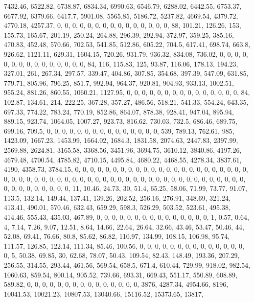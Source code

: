 \documentclass[
]{article}
\begin{document}
7432.46, 6522.82, 6738.87, 6834.34, 6990.63, 6546.79, 6288.02, 6442.55,
6753.37, 6677.92, 6379.66, 6417.7, 5901.08, 5565.85, 5186.72, 5237.82,
4669.54, 4379.72, 4770.18, 4257.37, 0, 0, 0, 0, 0, 0, 0, 0, 0, 0, 0, 0,
0, 0, 0, 88, 101.21, 126.26, 153, 155.73, 165.67, 201.19, 250.24,
264.88, 296.39, 292.94, 372.97, 359.25, 385.16, 470.83, 452.48, 570.66,
702.53, 541.85, 512.86, 605.22, 704.5, 617.41, 698.74, 663.8, 926.62,
1121.11, 629.31, 1604.15, 720.26, 931.79, 936.32, 834.08, 736.02, 0, 0,
0, 0, 0, 0, 0, 0, 0, 0, 0, 0, 0, 0, 0, 84, 116, 115.83, 125, 93.87,
116.06, 178.13, 194.23, 327.01, 261, 267.34, 297.57, 339.47, 404.86,
307.85, 354.68, 397.39, 547.09, 631.85, 779.71, 805.96, 796.25, 851.7,
992.94, 964.37, 920.81, 904.93, 933.13, 1002.51, 955.24, 881.26, 860.55,
1060.21, 1127.95, 0, 0, 0, 0, 0, 0, 0, 0, 0, 0, 0, 0, 0, 0, 0, 84,
102.87, 134.61, 214, 222.25, 367.28, 357.27, 486.56, 518.21, 541.33,
554.24, 643.35, 697.33, 774.22, 783.24, 770.19, 852.86, 864.07, 878.38,
928.41, 947.04, 895.94, 889.15, 923.74, 1064.05, 1007.27, 923.73,
816.62, 730.03, 732.5, 686.46, 689.75, 699.16, 709.5, 0, 0, 0, 0, 0, 0,
0, 0, 0, 0, 0, 0, 0, 0, 0, 539, 789.13, 762.61, 985, 1423.09, 1667.23,
1453.99, 1664.02, 1684.3, 1831.58, 2074.63, 2447.83, 2397.99, 2569.88,
2624.81, 3165.58, 3368.56, 3451.96, 3694.75, 3610.12, 3840.86, 4197.26,
4679.48, 4700.54, 4785.82, 4710.15, 4495.84, 4680.22, 4468.55, 4278.34,
3837.61, 4190, 4358.73, 3784.15, 0, 0, 0, 0, 0, 0, 0, 0, 0, 0, 0, 0, 0,
0, 0, 0, 0, 0, 0, 0, 0, 0, 0, 0, 0, 0, 0, 0, 0, 0, 0, 0, 0, 0, 0, 0, 0,
0, 0, 0, 0, 0, 0, 0, 0, 0, 0, 0, 0, 0, 0, 0, 0, 0, 0, 0, 0, 0, 0, 0, 0,
0, 0, 0, 11, 10.46, 24.73, 30, 51.4, 65.25, 58.06, 71.99, 73.77, 91.07,
113.5, 132.14, 149.44, 137.41, 139.26, 202.52, 256.16, 276.91, 348.69,
321.24, 413.41, 490.01, 570.46, 632.43, 659.29, 598.3, 526.29, 503.52,
523.61, 495.38, 414.46, 555.43, 435.03, 467.89, 0, 0, 0, 0, 0, 0, 0, 0,
0, 0, 0, 0, 0, 0, 0, 1, 0.57, 0.64, 4, 7.14, 7.26, 9.07, 12.51, 8.64,
14.66, 22.64, 26.64, 32.66, 43.46, 53.47, 50.46, 44, 52.08, 69.41,
76.66, 80.8, 85.62, 86.82, 110.97, 134.99, 108.15, 106.98, 95.74,
111.57, 126.85, 122.14, 111.34, 85.46, 100.56, 0, 0, 0, 0, 0, 0, 0, 0,
0, 0, 0, 0, 0, 0, 0, 5, 50.38, 69.85, 30, 62.68, 78.07, 50.43, 109.54,
82.43, 148.49, 193.36, 207.29, 256.55, 314.55, 293.44, 461.56, 569.54,
658.5, 671.4, 610.44, 729.99, 918.02, 982.54, 1060.63, 859.54, 800.14,
905.52, 739.66, 693.31, 669.43, 551.17, 550.89, 608.89, 589.82, 0, 0, 0,
0, 0, 0, 0, 0, 0, 0, 0, 0, 0, 0, 0, 3876, 4287.34, 4954.66, 8196,
10041.53, 10021.23, 10807.53, 13040.66, 15116.52, 15373.65, 13817,
\end{document}
